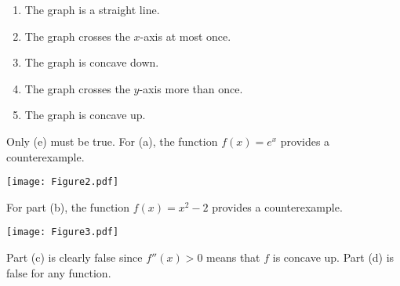 \documentclass[nooutcomes]{ximera}
\renewenvironment{freeResponse}{
\ifhandout\setbox0\vbox\bgroup\else
\begin{trivlist}\item[\hskip \labelsep\bfseries Solution:\hspace{2ex}]
\fi}
{\ifhandout\egroup\else
\end{trivlist}
\fi}
\begin{document}
\begin{problem}
\begin{enumerate}
\begin{enumerate}
                        \item The graph is a straight line.
                        \item The graph crosses the $x$-axis at most
                          once.
                        \item The graph is concave down.
                        \item The graph crosses the $y$-axis more than
                          once.
                        \item The graph is concave up.
		
                        \end{enumerate}

			\begin{freeResponse}
                          Only (e) must be true.  For (a), the
                          function $f(x) = e^x$ provides a
                          counterexample.
			
                          \begin{image}
                            \texttt{[image: Figure2.pdf]}
                          \end{image}
			
                          For part (b), the function $f(x) = x^2 -2$
                          provides a counterexample.
			
                          \begin{image}
                            \texttt{[image: Figure3.pdf]}
                          \end{image}
			
                          Part (c) is clearly false since $f''(x) > 0$
                          means that $f$ is concave up.  Part (d) is
                          false for any function.
			
			\end{freeResponse}
		
		
		
                      \end{enumerate}
                    \end{problem}
		
		

	
\newpage
\end{document}
